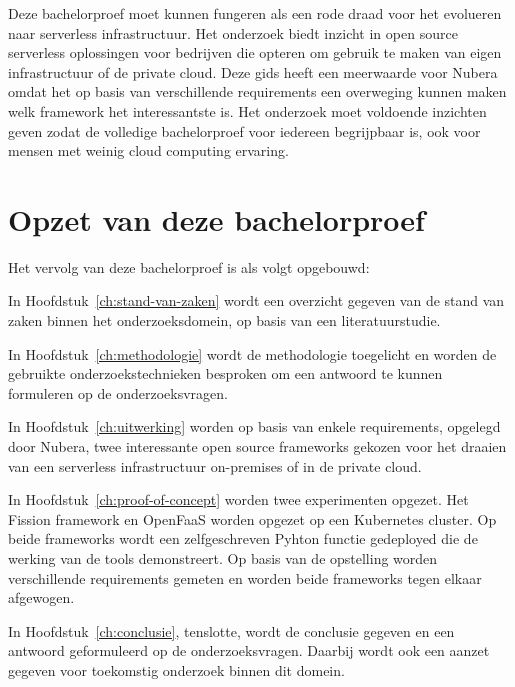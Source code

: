 Deze bachelorproef moet kunnen fungeren als een rode draad voor het evolueren naar serverless infrastructuur. Het onderzoek biedt inzicht in open source serverless oplossingen voor bedrijven die opteren om gebruik te maken van eigen infrastructuur of de private cloud. Deze gids heeft een meerwaarde voor Nubera omdat het op basis van verschillende requirements een overweging kunnen maken welk framework het interessantste is. Het onderzoek moet voldoende inzichten geven zodat de volledige bachelorproef voor iedereen begrijpbaar is, ook voor mensen met weinig cloud computing ervaring.


\section{Opzet van deze bachelorproef}
\label{sec:opzet-bachelorproef}


Het vervolg van deze bachelorproef is als volgt opgebouwd:

In Hoofdstuk~\ref{ch:stand-van-zaken} wordt een overzicht gegeven van de stand van zaken binnen het onderzoeksdomein, op basis van een literatuurstudie.

In Hoofdstuk~\ref{ch:methodologie} wordt de methodologie toegelicht en worden de gebruikte onderzoekstechnieken besproken om een antwoord te kunnen formuleren op de onderzoeksvragen.

In Hoofdstuk~\ref{ch:uitwerking} worden op basis van enkele requirements, opgelegd door Nubera, twee interessante open source frameworks gekozen voor het draaien van een serverless infrastructuur on-premises of in de private cloud.

In Hoofdstuk~\ref{ch:proof-of-concept} worden twee experimenten opgezet. Het Fission framework en OpenFaaS worden opgezet op een Kubernetes cluster. Op beide frameworks wordt een zelfgeschreven Pyhton functie gedeployed die de werking van de tools demonstreert. Op basis van de opstelling worden verschillende requirements gemeten en worden beide frameworks tegen elkaar afgewogen.

In Hoofdstuk~\ref{ch:conclusie}, tenslotte, wordt de conclusie gegeven en een antwoord geformuleerd op de onderzoeksvragen. Daarbij wordt ook een aanzet gegeven voor toekomstig onderzoek binnen dit domein.

